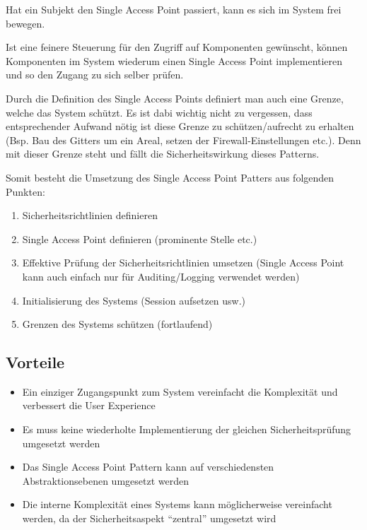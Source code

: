 Hat ein Subjekt den Single Access Point passiert, kann es sich im System frei bewegen.

Ist eine feinere Steuerung für den Zugriff auf Komponenten gewünscht, können Komponenten im System wiederum einen Single Access Point implementieren und so den Zugang zu sich selber prüfen.

Durch die Definition des Single Access Points definiert man auch eine Grenze, welche das System schützt. Es ist dabi wichtig nicht zu vergessen, dass entsprechender Aufwand nötig ist diese Grenze zu schützen/aufrecht zu erhalten (Bsp. Bau des Gitters um ein Areal, setzen der Firewall-Einstellungen etc.). Denn mit dieser Grenze steht und fällt die Sicherheitswirkung dieses Patterns.

Somit besteht die Umsetzung des Single Access Point Patters aus folgenden Punkten:

\begin{enumerate}
	\item Sicherheitsrichtlinien definieren
	\item Single Access Point definieren (prominente Stelle etc.)
	\item Effektive Prüfung der Sicherheitsrichtlinien umsetzen (Single Access Point kann auch einfach nur für Auditing/Logging verwendet werden)
	\item Initialisierung des Systems (Session aufsetzen usw.)
	\item Grenzen des Systems schützen (fortlaufend)
\end{enumerate}


\subsection*{Vorteile}
\begin{itemize}
	\item Ein einziger Zugangspunkt zum System vereinfacht die Komplexität und verbessert die User Experience
	\item Es muss keine wiederholte Implementierung der gleichen Sicherheitsprüfung umgesetzt werden
	\item Das Single Access Point Pattern kann auf verschiedensten Abstraktionsebenen umgesetzt werden
	\item Die interne Komplexität eines Systems kann möglicherweise vereinfacht werden, da der Sicherheitsaspekt ``zentral'' umgesetzt wird
\end{itemize}

